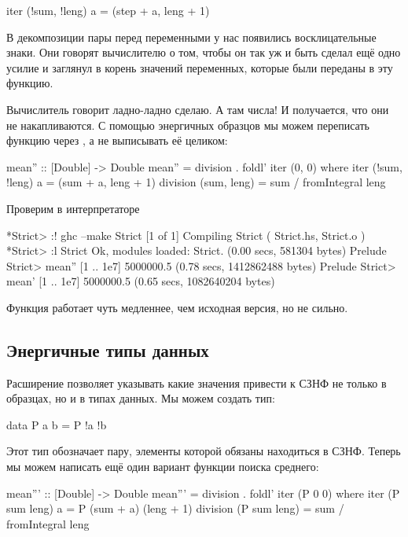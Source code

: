 \begin{code}
iter (!sum, !leng) a = (step + a, leng + 1)
\end{code}

В декомпозиции пары перед переменными у нас появились восклицательные
знаки. Они говорят вычислителю о том, чтобы он так уж и быть сделал ещё
одно усилие и заглянул в корень значений переменных, которые были
переданы в эту функцию.

Вычислитель говорит ладно-ладно сделаю. А там числа! И получается, что
они не накапливаются. С помощью энергичных образцов мы можем переписать
функцию  через , а не выписывать её целиком:


\begin{code}
mean'' :: [Double] -> Double
mean'' = division . foldl' iter (0, 0)
    where iter (!sum, !leng) a = (sum  + a, leng + 1)
          division (sum, leng) = sum / fromIntegral leng
\end{code}

Проверим в интерпретаторе


\begin{code}
*Strict> :! ghc --make Strict
[1 of 1] Compiling Strict           ( Strict.hs, Strict.o )
*Strict> :l Strict
Ok, modules loaded: Strict.
(0.00 secs, 581304 bytes)
Prelude Strict> mean'' [1 .. 1e7]
5000000.5
(0.78 secs, 1412862488 bytes)
Prelude Strict> mean' [1 .. 1e7]
5000000.5
(0.65 secs, 1082640204 bytes)
\end{code}

Функция работает чуть медленнее, чем исходная версия, но не сильно.

\subsection{Энергичные типы данных}

Расширение  позволяет указывать какие значения привести
к СЗНФ не только в образцах, но и в типах данных. Мы можем создать тип:


\begin{code}
data P a b = P !a !b
\end{code}

Этот тип обозначает пару, элементы которой обязаны находиться в СЗНФ.
Теперь мы можем написать ещё один вариант функции поиска среднего:


\begin{code}
mean''' :: [Double] -> Double
mean''' = division . foldl' iter (P 0 0)
    where iter (P sum leng) a = P (sum  + a) (leng + 1)
          division (P sum leng) = sum / fromIntegral leng
\end{code}

